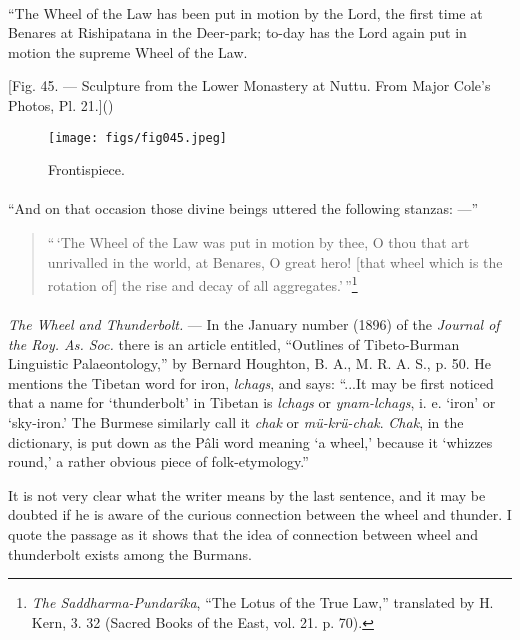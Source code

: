 \documentclass[a4paper, 11pt, oneside, polutonikogreek, english]{article}
\begin{document}
\paragraph{}
``The Wheel of the Law has been put in motion by the Lord, the first time at Benares at Rishipatana in the Deer-park; to-day has the Lord again put in motion the supreme Wheel of the Law.

[Fig. 45. --- Sculpture from the Lower Monastery at Nuttu. From Major Cole's Photos, Pl. 21.]()
\begin{figure}[H]
\centering
\texttt{[image: figs/fig045.jpeg]}
\caption{Frontispiece.}
\end{figure}
\paragraph{}
``And on that occasion those divine beings uttered the following stanzas: ---''

\begin{quotation}\small
``\,`The Wheel of the Law was put in motion by thee, O thou that art unrivalled in the world, at Benares, O great hero! [that wheel which is the rotation of] the rise and decay of all aggregates.'\,''\footnote{\emph{The Saddharma-Pundarîka}, ``The Lotus of the True Law,'' translated by H. Kern, 3. 32 (Sacred Books of the East, vol. 21. p. 70).}
\end{quotation}
\paragraph{}
\emph{The Wheel and Thunderbolt.} --- In the January number (1896) of the \emph{Journal of the Roy. As. Soc.} there is an article entitled, ``Outlines of Tibeto-Burman Linguistic Palaeontology,'' by Bernard Houghton, B. A., M. R. A. S., p. 50. He mentions the Tibetan word for iron, \emph{lchags}, and says: ``...It may be first noticed that a name for `thunderbolt' in Tibetan is \emph{lchags} or \emph{ynam-lchags}, i. e. `iron' or `sky-iron.' The Burmese similarly call it \emph{chak} or \emph{mü-krü-chak}. \emph{Chak}, in the dictionary, is put down as the Pâli word meaning `a wheel,' because it `whizzes round,' a rather obvious piece of folk-etymology.''

It is not very clear what the writer means by the last sentence, and it may be doubted if he is aware of the curious connection between the wheel and thunder. I quote the passage as it shows that the idea of connection between wheel and thunderbolt exists among the Burmans.
\end{document}
